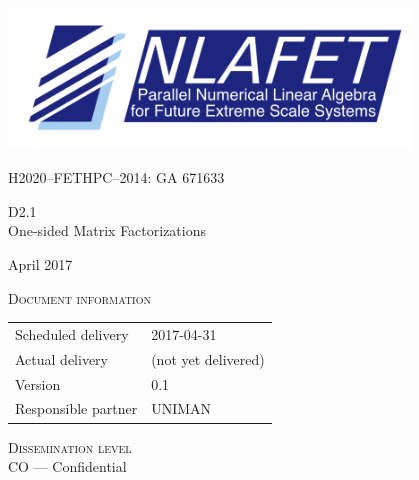 \documentclass[a4paper,12pt]{article}
\def\nlafetMajor{2}
\def\nlafetMinor{1}
\def\nlafetTitle{One-sided Matrix Factorizations}
\def\nlafetMonth{April}
\def\nlafetYear{2017}
\def\nlafetScheduledDelivery{2017-04-31}
\def\nlafetActualDelivery{(not yet delivered)}
\def\nlafetVersionMajor{0}
\def\nlafetVersionMinor{1}
\def\nlafetResponsiblePartner{UNIMAN}
\def\nlafetDisseminationLevel{CO --- Confidential}
\begin{document}
\begin{titlepage}
  \centering
  {
    \includegraphics[width=0.8\textwidth]{NLAFET-logo2}
  }
  \par
  \vspace{5mm}
  {
    H2020--FETHPC--2014: GA 671633
  }
  \par
  \vspace{4cm}
  {
    \Huge
    D\nlafetMajor.\nlafetMinor\\[1em]
    \nlafetTitle
  }
  \par
  \vfill
  {
    \Large
    \nlafetMonth{}
    \nlafetYear
  }
\end{titlepage}



%

\newpage




\noindent
\textsc{Document information}\\[1em]
\begin{tabular}{@{}ll}
  Scheduled delivery & \nlafetScheduledDelivery \\
  Actual delivery & \nlafetActualDelivery \\
  Version & \nlafetVersionMajor.\nlafetVersionMinor \\
  Responsible partner & \nlafetResponsiblePartner \\
\end{tabular}

\vspace{2em}




\noindent
\textsc{Dissemination level}\\[1em]
\nlafetDisseminationLevel
\end{document}
